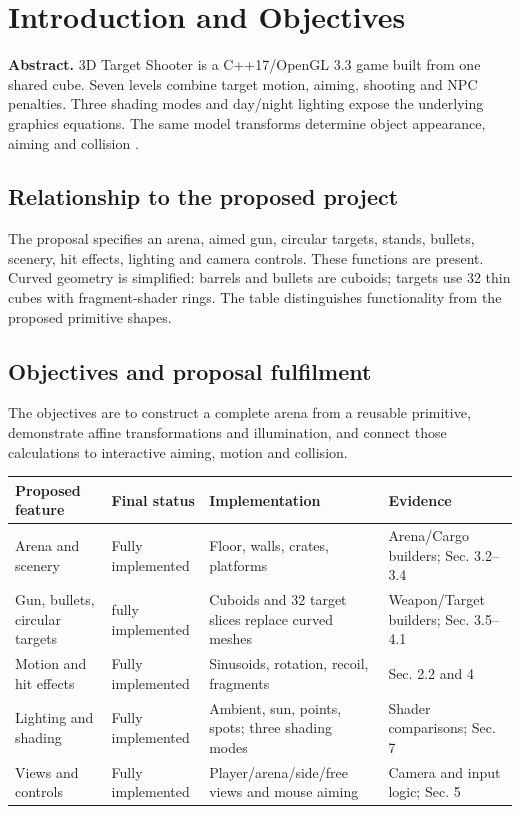 \section{Introduction and Objectives}
\textbf{Abstract.} 3D Target Shooter is a C++17/OpenGL 3.3 game built from one shared cube. Seven levels combine target motion, aiming, shooting and NPC penalties. Three shading modes and day/night lighting expose the underlying graphics equations. The same model transforms determine object appearance, aiming and collision \cite{project}.
\subsection{Relationship to the proposed project}
The proposal specifies an arena, aimed gun, circular targets, stands, bullets, scenery, hit effects, lighting and camera controls. These functions are present. Curved geometry is simplified: barrels and bullets are cuboids; targets use 32 thin cubes with fragment-shader rings. The table distinguishes functionality from the proposed primitive shapes.
\subsection{Objectives and proposal fulfilment}
The objectives are to construct a complete arena from a reusable primitive, demonstrate affine transformations and illumination, and connect those calculations to interactive aiming, motion and collision.
\begin{center}\begin{tabularx}{\linewidth}{L{.20\linewidth}L{.20\linewidth}XX}\toprule
Proposed feature & Final status & Implementation & Evidence \\\midrule
Arena and scenery & Fully implemented & Floor, walls, crates, platforms & Arena/Cargo builders; Sec. 3.2--3.4\\
Gun, bullets, circular targets & fully implemented & Cuboids and 32 target slices replace curved meshes & Weapon/Target builders; Sec. 3.5--4.1\\
Motion and hit effects & Fully implemented & Sinusoids, rotation, recoil, fragments & Sec. 2.2 and 4\\
Lighting and shading & Fully implemented & Ambient, sun, points, spots; three shading modes & Shader comparisons; Sec. 7\\
Views and controls & Fully implemented & Player/arena/side/free views and mouse aiming & Camera and input logic; Sec. 5\\\bottomrule
\end{tabularx}\end{center}

